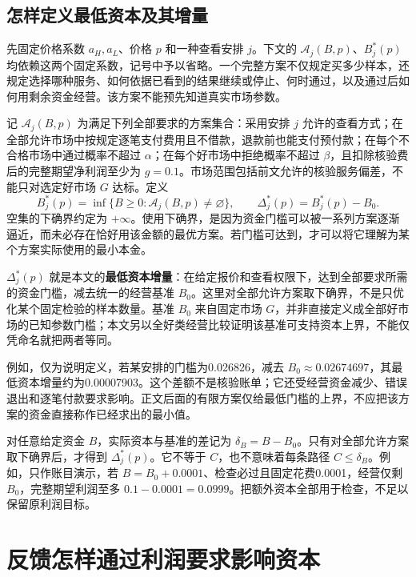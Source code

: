 \documentclass[UTF8,fontset=windows,11pt,a4paper]{ctexart}
\numberwithin{equation}{section}
\begin{document}
\subsection{怎样定义最低资本及其增量}
先固定价格系数 $a_H,a_L$、价格 $p$ 和一种查看安排 $j$。下文的 $\mathcal A_j(B,p)$、$B_j^*(p)$ 均依赖这两个固定系数，记号中予以省略。一个完整方案不仅规定买多少样本，还规定选择哪种服务、如何依据已看到的结果继续或停止、何时通过，以及通过后如何用剩余资金经营。该方案不能预先知道真实市场参数。

记 $\mathcal A_j(B,p)$ 为满足下列全部要求的方案集合：采用安排 $j$ 允许的查看方式；在全部允许市场中按规定逐笔支付费用且不借款，退款前也能支付预付款；在每个不合格市场中通过概率不超过 $\alpha$；在每个好市场中拒绝概率不超过 $\beta$，且扣除核验费后的完整期望净利润至少为 $g=0.1$。市场范围包括前文允许的核验服务偏差，不能只对选定好市场 $G$ 达标。定义
\begin{equation}\label{eq:capital-definition}
 B_j^*(p)=\inf\{B\ge0:\mathcal A_j(B,p)\ne\varnothing\},
 \qquad \Delta_j^*(p)=B_j^*(p)-B_0.
\end{equation}
空集的下确界约定为 $+\infty$。使用下确界，是因为资金门槛可以被一系列方案逐渐逼近，而未必存在恰好用该金额的最优方案。若门槛可达到，才可以将它理解为某个方案实际使用的最小本金。

$\Delta_j^*(p)$ 就是本文的\textbf{最低资本增量}：在给定报价和查看权限下，达到全部要求所需的资金门槛，减去统一的经营基准 $B_0$。这里对全部允许方案取下确界，不是只优化某个固定检验的样本数量。基准 $B_0$ 来自固定市场 $G$，并非直接定义成全部好市场的已知参数门槛；本文另以全好类经营比较证明该基准可支持资本上界，不能仅凭命名就把两者等同。

例如，仅为说明定义，若某安排的门槛为0.026826，减去 $B_0\approx0.02674697$，其最低资本增量约为0.00007903。这个差额不是核验账单；它还受经营资金减少、错误退出和逐笔付款要求影响。正文后面的有限方案仅给最低门槛的上界，不应把该方案的资金直接称作已经求出的最小值。

对任意给定资金 $B$，实际资本与基准的差记为 $\delta_B=B-B_0$。只有对全部允许方案取下确界后，才得到 $\Delta_j^*(p)$。它不等于 $C$，也不意味着每条路径 $C\le\delta_B$。例如，只作账目演示，若 $B=B_0+0.0001$、检查必过且固定花费0.0001，经营仅剩 $B_0$，完整期望利润至多 $0.1-0.0001=0.0999$。把额外资本全部用于检查，不足以保留原利润目标。

\section{反馈怎样通过利润要求影响资本}
\end{document}
